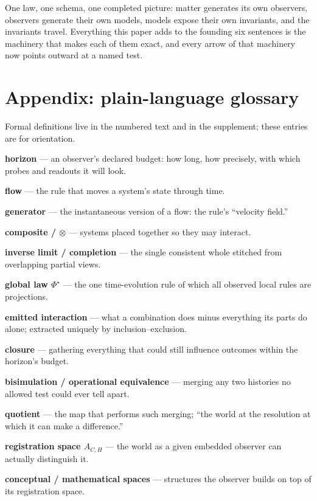 \documentclass[11pt]{article}
\theoremstyle{definition}
\begin{document}
One law, one schema, one completed picture: matter generates its own observers, observers generate their own models, models expose their own invariants, and the invariants travel. Everything this paper adds to the founding six sentences is the machinery that makes each of them exact, and every arrow of that machinery now points outward at a named test.

\section*{Appendix: plain-language glossary}

Formal definitions live in the numbered text and in the supplement; these entries are for orientation.

\noindent\textbf{horizon} --- an observer's declared budget: how long, how precisely, with which probes and readouts it will look.

\noindent\textbf{flow} --- the rule that moves a system's state through time.

\noindent\textbf{generator} --- the instantaneous version of a flow: the rule's ``velocity field.''

\noindent\textbf{composite / $\otimes$} --- systems placed together so they may interact.

\noindent\textbf{inverse limit / completion} --- the single consistent whole stitched from overlapping partial views.

\noindent\textbf{global law $\Phi^{\star}$} --- the one time-evolution rule of which all observed local rules are projections.

\noindent\textbf{emitted interaction} --- what a combination does minus everything its parts do alone; extracted uniquely by inclusion--exclusion.

\noindent\textbf{closure} --- gathering everything that could still influence outcomes within the horizon's budget.

\noindent\textbf{bisimulation / operational equivalence} --- merging any two histories no allowed test could ever tell apart.

\noindent\textbf{quotient} --- the map that performs such merging; ``the world at the resolution at which it can make a difference.''

\noindent\textbf{registration space $A_{C,H}$} --- the world as a given embedded observer can actually distinguish it.

\noindent\textbf{conceptual / mathematical spaces} --- structures the observer builds on top of its registration space.
\end{document}

